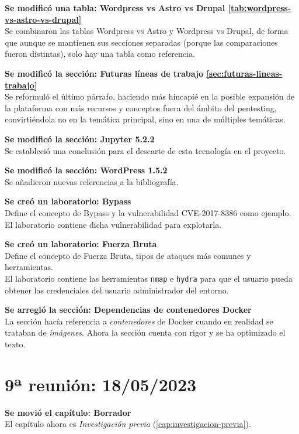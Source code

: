         \textbf{Se modificó una tabla: Wordpress vs Astro vs Drupal \ref{tab:wordpress-vs-astro-vs-drupal}} \\
        Se combinaron las tablas Wordpress vs Astro y Wordpress vs Drupal, de forma que aunque se mantienen sus secciones separadas (porque las comparaciones fueron distintas), solo hay una tabla como referencia.

        \textbf{Se modificó la sección: Futuras líneas de trabajo \ref{sec:futuras-lineas-trabajo}} \\
        Se reformuló el último párrafo, haciendo más hincapié en la posible expansión de la plataforma con más recursos y conceptos fuera del ámbito del pentesting, convirtiéndola no en la temática principal, sino en una de múltiples temáticas.

        \textbf{Se modificó la sección: Jupyter 5.2.2} \\
        Se estableció una conclusión para el descarte de esta tecnología en el proyecto.

        \textbf{Se modificó la sección: WordPress 1.5.2} \\
        Se añadieron nuevas referencias a la bibliografía.

        \textbf{Se creó un laboratorio: Bypass} \\
        Define el concepto de Bypass y la vulnerabilidad CVE-2017-8386 como ejemplo. \\
        El laboratorio contiene dicha vulnerabilidad para explotarla.
        
        \textbf{Se creó un laboratorio: Fuerza Bruta} \\
        Define el concepto de Fuerza Bruta, tipos de ataques más comunes y herramientas. \\
        El laboratorio contiene las herramientas \texttt{nmap} e \texttt{hydra} para que el usuario pueda obtener las credenciales del usuario administrador del entorno.
        
        \textbf{Se arregló la sección: Dependencias de contenedores Docker} \\
        La sección hacía referencia a \textit{contenedores} de Docker cuando en realidad se trataban de \textit{imágenes}. Ahora la sección cuenta con rigor y se ha optimizado el texto.

        \newpage

    \section{9ª reunión: 18/05/2023}

        \textbf{Se movió el capítulo: Borrador} \\
        El capítulo ahora es \textit{Investigación previa} (\ref{cap:investigacion-previa}).